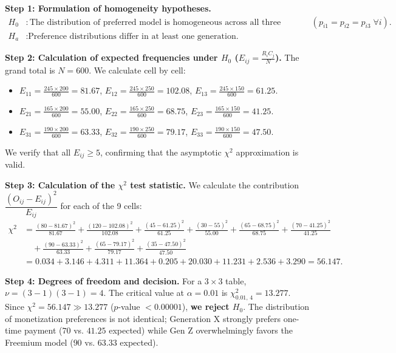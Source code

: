 \begin{solucion}
	\textbf{Step 1: Formulation of homogeneity hypotheses.}
	\begin{align}
		H_0&: \text{The distribution of preferred model is homogeneous across all three generations } (p_{i1}=p_{i2}=p_{i3} \; \forall i). \\
		H_a&: \text{Preference distributions differ in at least one generation.}
	\end{align}
	
	\textbf{Step 2: Calculation of expected frequencies under $H_0$ ($E_{ij} = \frac{R_i C_j}{N}$).}
	The grand total is $N = 600$. We calculate cell by cell:
	\begin{itemize}
		\item $E_{11} = \frac{245 \times 200}{600} = 81.67$, \quad $E_{12} = \frac{245 \times 250}{600} = 102.08$, \quad $E_{13} = \frac{245 \times 150}{600} = 61.25$.
		\item $E_{21} = \frac{165 \times 200}{600} = 55.00$, \quad $E_{22} = \frac{165 \times 250}{600} = 68.75$, \quad $E_{23} = \frac{165 \times 150}{600} = 41.25$.
		\item $E_{31} = \frac{190 \times 200}{600} = 63.33$, \quad $E_{32} = \frac{190 \times 250}{600} = 79.17$, \quad $E_{33} = \frac{190 \times 150}{600} = 47.50$.
	\end{itemize}
	We verify that all $E_{ij} \geq 5$, confirming that the asymptotic $\chi^2$ approximation is valid.
	
	\textbf{Step 3: Calculation of the $\chi^2$ test statistic.}
	We calculate the contribution $\dfrac{(O_{ij}-E_{ij})^2}{E_{ij}}$ for each of the 9 cells:
	\begin{align}
		\chi^2 &= \frac{(80-81.67)^2}{81.67} + \frac{(120-102.08)^2}{102.08} + \frac{(45-61.25)^2}{61.25} + \frac{(30-55)^2}{55.00} + \frac{(65-68.75)^2}{68.75} + \frac{(70-41.25)^2}{41.25} \nonumber \\
		&\quad + \frac{(90-63.33)^2}{63.33} + \frac{(65-79.17)^2}{79.17} + \frac{(35-47.50)^2}{47.50} \\
		&= 0.034 + 3.146 + 4.311 + 11.364 + 0.205 + 20.030 + 11.231 + 2.536 + 3.290 = 56.147.
	\end{align}
	
	\textbf{Step 4: Degrees of freedom and decision.}
	For a $3 \times 3$ table, $\nu = (3-1)(3-1) = 4$. The critical value at $\alpha = 0.01$ is $\chi^2_{0.01, \, 4} = 13.277$.
	Since $\chi^2 = 56.147 \gg 13.277$ ($p$-value $< 0.00001$), \textbf{we reject $H_0$}. The distribution of monetization preferences is not identical; Generation X strongly prefers one-time payment ($70$ vs. $41.25$ expected) while Gen Z overwhelmingly favors the Freemium model ($90$ vs. $63.33$ expected).
\end{solucion}

